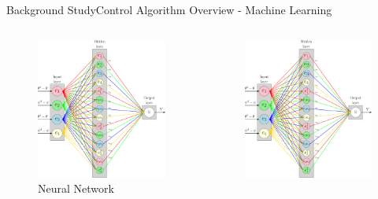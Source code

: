 \documentclass{beamer}
\begin{document}
\begin{frame}{Background Study}{Control Algorithm Overview - Machine Learning}
    \begin{columns}
    \begin{figure}
        \centering
        \includegraphics[width=\textwidth]{figs/ipe/ADP_Neural_Network}
        \caption{Neural Network}
        \label{fig:ADP_Neural_Networkl}
    \end{figure}
    \begin{figure}
      \centering 
      \includegraphics[width=\textwidth]{figs/ipe/ADP_Neural_Network}

\end{figure}
\end{columns}
\end{frame}
\end{document}
